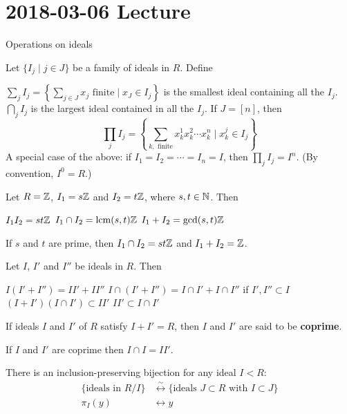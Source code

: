 \section{2018-03-06 Lecture}

Operations on ideals

\begin{defn}
	Let $\{I_j \mid j \in J\}$ be a family of ideals in $R$.
	Define
	\begin{itm}
		\io $\sum_j I_j = \left\{ \sum_{j \in J} x_j \text{ finite} \mid x_J \in I_j \right\}$ is the smallest ideal containing all the $I_j$.
		\io $\bigcap_j I_j$ is the largest ideal contained in all the $I_j$.
		\io If $J = [n]$, then
		\[\prod_j I_j = \left\{ \sum_{k,\text{ finite}} x_k^1 x_k^2 \cdots x_k^n \mid x_k^j \in I_j\right\}\]
		\io A special case of the above: if $I_1=I_2=\cdots=I_n=I$, then $\prod_j I_j = I^n$.
		(By convention, $I^0=R$.)
	\end{itm}
\end{defn}

\begin{exam}
	Let $R=\mathbb{Z}$, $I_1 = s\mathbb{Z}$ and $I_2 = t\mathbb{Z}$, where $s,t \in \mathbb{N}$.
	Then
	\begin{itm}
		\io $I_1 I_2 = st\mathbb{Z}$
		\io $I_1 \cap I_2 = \operatorname*{lcm}(s,t)\mathbb{Z}$
		\io $I_1+I_2 = \gcd(s,t)\mathbb{Z}$
	\end{itm}
	If $s$ and $t$ are prime, then $I_1 \cap I_2 = st\mathbb{Z}$ and $I_1+I_2=\mathbb{Z}$.
\end{exam}

\begin{prop}
	Let $I$, $I'$ and $I''$ be ideals in $R$.
	Then
	\begin{itm}
		\io $I(I'+I'') = II'+II''$
		\io $I \cap (I'+I'') = I \cap I' + I \cap I''$ if $I',I'' \subset I$
		\io $(I+I')(I \cap I') \subset II'$
		\io $II' \subset I \cap I'$
	\end{itm}
\end{prop}

\begin{defn}
	If ideals $I$ and $I'$ of $R$ satisfy $I+I'=R$, then $I$ and $I'$ are said to be \textbf{coprime}.
\end{defn}

\begin{prop}
	If $I$ and $I'$ are coprime then $I \cap I = II'$.
\end{prop}

\begin{prop}
	There is an inclusion-preserving bijection for any ideal $I<R$:
	\begin{align*}
		\{\text{ideals in } R/I\} &\overset{\sim}{\longleftrightarrow} \{\text{ideals } J \subset R \text{ with } I \subset J\} \\
		\pi_I(y) &\longleftrightarrow y
	\end{align*}
\end{prop}

